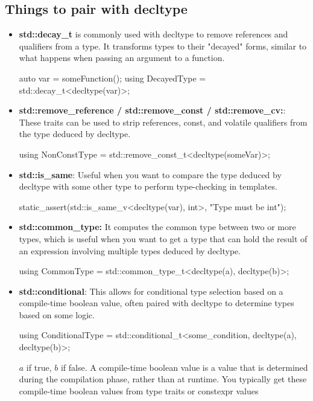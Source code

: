\documentclass{report}
\begin{document}
   \bigbreak \noindent 
   \subsection{Things to pair with decltype}
   \begin{itemize}
       \item \textbf{std::decay\_t} is commonly used with decltype to remove references and qualifiers from a type. It transforms types to their "decayed" forms, similar to what happens when passing an argument to a function.
           \bigbreak \noindent 
           \begin{cppcode}
               auto var = someFunction();
               using DecayedType = std::decay_t<decltype(var)>;
           \end{cppcode}
        \item \textbf{std::remove\_reference / std::remove\_const / std::remove\_cv:}: These traits can be used to strip references, const, and volatile qualifiers from the type deduced by decltype.
            \bigbreak \noindent 
            \begin{cppcode}
            using NonConstType = std::remove_const_t<decltype(someVar)>;
            \end{cppcode}
        \item \textbf{std::is\_same}: Useful when you want to compare the type deduced by decltype with some other type to perform type-checking in templates.
            \bigbreak \noindent 
            \begin{cppcode}
            static_assert(std::is_same_v<decltype(var), int>, "Type must be int");
            \end{cppcode}
        \item \textbf{std::common\_type:} It computes the common type between two or more types, which is useful when you want to get a type that can hold the result of an expression involving multiple types deduced by decltype.
            \bigbreak \noindent 
            \begin{cppcode}
            using CommonType = std::common_type_t<decltype(a), decltype(b)>;
            \end{cppcode}
        \item \textbf{std::conditional}: This allows for conditional type selection based on a compile-time boolean value, often paired with decltype to determine types based on some logic.
            \bigbreak \noindent 
            \begin{cppcode}
            using ConditionalType = std::conditional_t<some_condition, decltype(a), decltype(b)>;
            \end{cppcode}
            \bigbreak \noindent 
            $a$ if true, $b$ if false. A compile-time boolean value is a value that is determined during the compilation phase, rather than at runtime. You typically get these compile-time boolean values from type traits or constexpr values
   \end{itemize}
\end{document}
